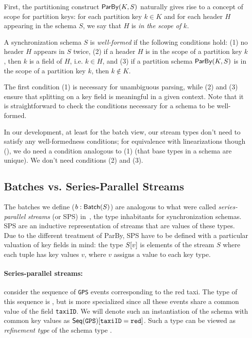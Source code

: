 \begin{definition}
\label{45:def:well-formed-sync-schema}
First, the partitioning construct $\keyby{K}{S}$ naturally gives rise to a concept of
scope for partition keys: for each partition key $k \in K$ and for each
header $H$ appearing in the schema $S$,
we say that $H$ is \emph{in the scope of} $k$.

A synchronization schema $S$ is \emph{well-formed} if the following conditions hold: (1) no header $H$ appears in $S$ twice,
    (2) if a header $H$ is in the scope of a partition key $k$, then $k$ is a field of $H$, i.e. $k \in H$, and
    (3) if a partition schema $\keyby{K}{S}$ is in the scope of a partition key $k$, then $k \not \in K$.
\end{definition}

The first condition (1) is necessary for unambiguous parsing, while (2) and (3)
ensure that splitting on a key field is meaningful in a given context.
Note that it is straightforward to check the conditions necessary for a schema to be well-formed.

In our development, at least for the batch view, our stream types don't need to satisfy any well-formedness conditions; for equivalence with linearizations though (), we do need a condition analogous to (1) (that base types in a schema are unique). We don't need conditions (2) and (3).

\subsection{Batches vs. Series-Parallel Streams}

The batches we define ($\batchtype{b}{S}$) are analogous to what were called
\emph{series-parallel streams} (or SPS) in~, the type inhabitants for synchronization schemas.
SPS are an inductive representation of streams that are values of these types.
Due to the different treatment of ParBy,
SPS have to be defined with a particular valuation of key fields in mind: the type $\spstype{v}{S}$ is elements of the stream $S$ where each tuple has key values $v$, where $v$ assigns a value to each key type.

\paragraph{Series-parallel streams:} consider the sequence of \texttt{GPS} events corresponding
to the red taxi. The type of this sequence is , but is more specialized
since all these events share a common value of the field \texttt{taxiID}.
We will denote such an instantiation of the schema with common key values
as $\spstype{\texttt{taxiID}=\texttt{red}}{\seqleaf{\texttt{GPS}}}$. Such a type can
be viewed as {\em refinement type} of the schema type .

